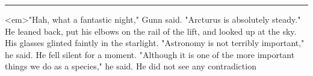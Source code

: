 \par\noindent\rule{\textwidth}{0.4pt}
<em>"Hah, what a fantastic night," Gunn said.
"Arcturus is absolutely steady."  He leaned back, put
his elbows on the rail of the lift, and looked up at the sky.
His glasses glinted faintly in the starlight.  "Astronomy
is not terribly important," he said.  He fell silent for a 
moment.  "Although it is one of the more important things
we do as a species," he said.  He did not see any contradiction


